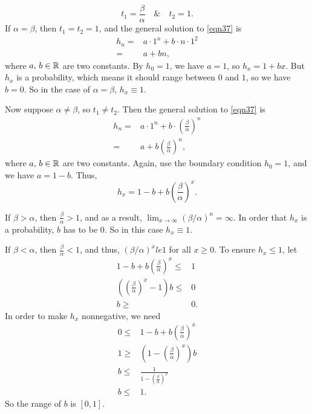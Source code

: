 \begin{enumerate}
\begin{itemize}
\begin{equation*}
            t_1 = \frac{\beta}{\alpha} \quad \& \quad t_2 = 1.
        \end{equation*}
        If $\alpha = \beta$, then $t_1 = t_2 = 1$, and the general solution to \eqref{eqn37} is 
        \begin{align*}
            h_n = & a \cdot 1^n + b \cdot n \cdot 1^2 \\ 
            = & a + bn,
        \end{align*}
        where $a,\,b\in\mathbb{R}$ are two constants. By $h_0 = 1$, we have $a = 1$, so $h_x = 1 + bx$. But $h_x$ is a probability, which means it should range between $0$ and $1$, so we have $b = 0$. So in the case of $\alpha = \beta$, $h_x \equiv 1$.

        Now suppose $\alpha \neq \beta$, so $t_1 \neq t_2$. Then the general solution to \eqref{eqn37} is 
        \begin{align*}
            h_n = & a \cdot 1^n + b \cdot \left( \frac{\beta}{\alpha} \right)^n \\ 
            = & a + b \left( \frac{\beta}{\alpha} \right)^n,
        \end{align*}
        where $a,\,b\in\mathbb{R}$ are two constants. Again, use the boundary condition $h_0 = 1$, and we have $a = 1 - b$. Thus, 
        $$h_x = 1 - b + b \left( \frac{\beta}{\alpha} \right)^x.$$

        If $\beta > \alpha$, then $\frac{\beta}{\alpha} > 1$, and as a result, 
        $\lim_{x \to \infty} (\beta / \alpha)^n = \infty$. In order that $h_x$ is a probability, $b$ has to be $0$. So in this case $h_x \equiv 1$. 

        If $\beta < \alpha$, then $\frac{\beta}{\alpha} < 1$, and thus, $(\beta / \alpha)^x le 1$ for all $x \ge 0$. To ensure $h_x \le 1$, let
        \begin{align*}
             1 - b + b \left( \frac{\beta}{\alpha} \right)^x \le & 1 \\ 
             \left( \left( \frac{\beta}{\alpha} \right)^x - 1 \right) b \le & 0\\
             b \ge & 0.
        \end{align*}
        In order to make $h_x$ nonnegative, we need 
        \begin{align*}
            0 \le & 1 - b + b \left( \frac{\beta}{\alpha} \right)^x \\
            1 \ge & \left(1 - \left( \frac{\beta}{\alpha} \right)^x \right) b \\
            b \le & \frac{1}{1 - \left( \frac{\beta}{\alpha}\right)^x} \\ 
            b \le & 1.
        \end{align*}
        So the range of $b$ is $[0, 1]$.


\end{itemize}
\end{enumerate}
